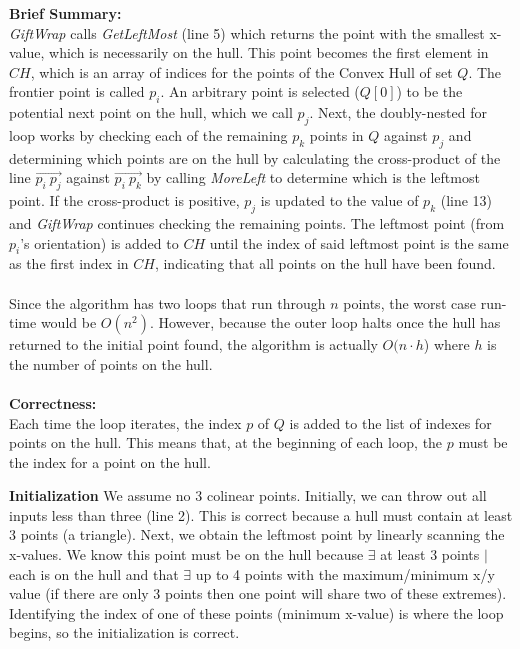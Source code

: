 \documentclass[11pt]{article}
\begin{document}
\noindent \textbf{Brief Summary:}\\
\textit{GiftWrap} calls \textit{GetLeftMost} (line 5) which returns the point with the smallest x-value, which is necessarily on the hull. This point becomes the first element in $CH$, which is an array of indices for the points of the Convex Hull of set $Q$. The frontier point is called $p_i$. An arbitrary point is selected ($Q[0]$) to be the potential next point on the hull, which we call $p_j$. Next, the doubly-nested for loop works by checking each of the remaining $p_k$ points in $Q$ against $p_j$ and determining which points are on the hull by calculating the cross-product of the line $\overrightarrow{{p_i\> }p_j}$ against $\overrightarrow{{p_i\>}{p_k}}$
 by calling \textit{MoreLeft} to determine which is the leftmost point. If the cross-product is positive, $p_j$ is updated to the value of $p_k$ (line 13) and \textit{GiftWrap} continues checking the remaining points. The leftmost point (from $p_i$'s orientation) is added to $CH$ until the index of said leftmost point is the same as the first index in $CH$, indicating that all points on the hull have been found.\\\\
Since the algorithm has two loops that run through $n$ points, the worst case run-time would be $O(n^2)$. However, because the outer loop halts once the hull has returned to the initial point found, the algorithm is actually $O (n \cdot h$) where $h$ is the number of points on the hull. \\\\
\textbf{Correctness:}\\

Each time the loop iterates, the index $p$ of $Q$ is added to the list of indexes for points on the hull. This means that, at the beginning of each loop, the $p$ must be the index for a point on the hull. 

\textbf{Initialization} We assume no 3 colinear points. Initially, we can throw out all inputs less than three (line 2). This is correct because a hull must contain at least 3 points (a triangle). Next, we obtain the leftmost point by linearly scanning the x-values. We know this point must be on the hull because $\exists $ at least 3 points $\mid$ each is on the hull and that $\exists$ up to 4 points with the maximum/minimum x/y value (if there are only 3 points then one point will share two of these extremes). Identifying the index of one of these points (minimum x-value) is where the loop begins, so the initialization is correct. 
\end{document}

